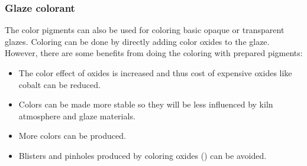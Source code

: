 \subsubsection{Glaze colorant}
The color pigments can also be used for coloring basic opaque or transparent 
glazes. Coloring can be done by directly adding color oxides to the glaze. 
However, there are some benefits from doing the coloring with prepared pigments:
\begin{itemize}
\item The color effect of oxides is increased and thus cost of expensive oxides 
like cobalt can be reduced.
\item Colors can be made more stable so they will be less influenced by kiln 
atmosphere and glaze materials.
\item More colors can be produced.
\item Blisters and pinholes produced by coloring oxides () can be 
avoided.
\end{itemize}
